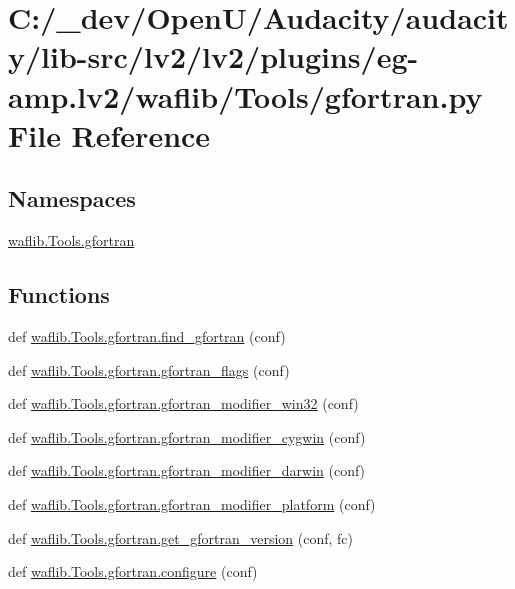 \hypertarget{lv2_2plugins_2eg-amp_8lv2_2waflib_2_tools_2gfortran_8py}{}\section{C\+:/\+\_\+dev/\+Open\+U/\+Audacity/audacity/lib-\/src/lv2/lv2/plugins/eg-\/amp.lv2/waflib/\+Tools/gfortran.py File Reference}
\label{lv2_2plugins_2eg-amp_8lv2_2waflib_2_tools_2gfortran_8py}
\subsection*{Namespaces}
\begin{DoxyCompactItemize}
\item 
 \hyperlink{namespacewaflib_1_1_tools_1_1gfortran}{waflib.\+Tools.\+gfortran}
\end{DoxyCompactItemize}
\subsection*{Functions}
\begin{DoxyCompactItemize}
\item 
def \hyperlink{namespacewaflib_1_1_tools_1_1gfortran_a831f2f61b251e9981867542649f2339d}{waflib.\+Tools.\+gfortran.\+find\+\_\+gfortran} (conf)
\item 
def \hyperlink{namespacewaflib_1_1_tools_1_1gfortran_a08762d92086757a2af5414ff6aef84e9}{waflib.\+Tools.\+gfortran.\+gfortran\+\_\+flags} (conf)
\item 
def \hyperlink{namespacewaflib_1_1_tools_1_1gfortran_ad22cc6d0d2b302315d031dcb2c035c49}{waflib.\+Tools.\+gfortran.\+gfortran\+\_\+modifier\+\_\+win32} (conf)
\item 
def \hyperlink{namespacewaflib_1_1_tools_1_1gfortran_abf2215270c976ac6aa31055132d201a6}{waflib.\+Tools.\+gfortran.\+gfortran\+\_\+modifier\+\_\+cygwin} (conf)
\item 
def \hyperlink{namespacewaflib_1_1_tools_1_1gfortran_a3124f50b1bc53ecd3fafbcf79f296414}{waflib.\+Tools.\+gfortran.\+gfortran\+\_\+modifier\+\_\+darwin} (conf)
\item 
def \hyperlink{namespacewaflib_1_1_tools_1_1gfortran_af3b109053ce35738f8f717bbd9eb4076}{waflib.\+Tools.\+gfortran.\+gfortran\+\_\+modifier\+\_\+platform} (conf)
\item 
def \hyperlink{namespacewaflib_1_1_tools_1_1gfortran_a9d31db08b155f317bf0b19a8c1f72b57}{waflib.\+Tools.\+gfortran.\+get\+\_\+gfortran\+\_\+version} (conf, fc)
\item 
def \hyperlink{namespacewaflib_1_1_tools_1_1gfortran_acd792ef8a96cbe13a82a54ce98896db5}{waflib.\+Tools.\+gfortran.\+configure} (conf)
\end{DoxyCompactItemize}
